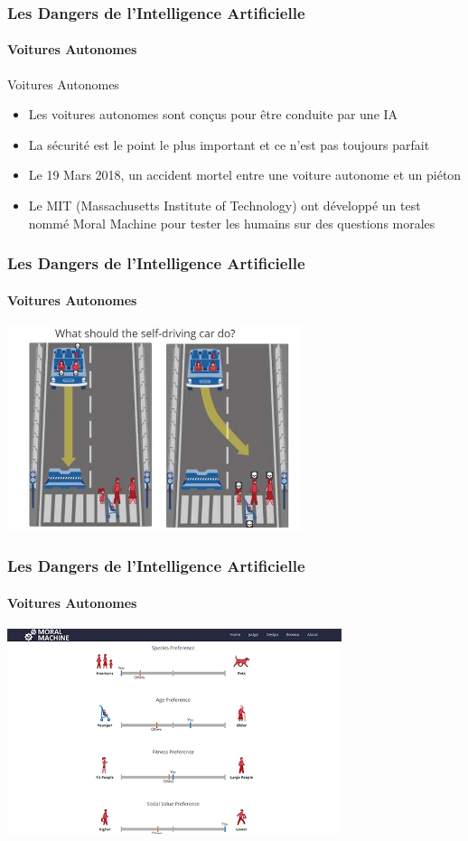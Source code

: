 \documentclass{beamer}
\begin{document}
	\begin{frame}
	\frametitle{Les Dangers de l'Intelligence Artificielle}
	\framesubtitle{Voitures Autonomes}
	\begin{block}{Voitures Autonomes}
	\begin{itemize}
	\itemsep1em
		\item Les voitures autonomes sont conçus pour être conduite par une IA
		\item La sécurité est le point le plus important et ce n'est pas toujours parfait
		\item Le 19 Mars 2018, un accident mortel entre une voiture autonome et un piéton
		\item Le MIT (Massachusetts Institute of Technology) ont développé un test nommé Moral Machine pour tester les humains sur des questions morales
	\end{itemize}
	\end{block}
	\end{frame}
	
	\begin{frame}
	\frametitle{Les Dangers de l'Intelligence Artificielle}
	\framesubtitle{Voitures Autonomes}
	\centerline{\includegraphics[height=6cm]{MIT.jpg}}
	\end{frame}
	
	\begin{frame}
	\frametitle{Les Dangers de l'Intelligence Artificielle}
	\framesubtitle{Voitures Autonomes}
	\centerline{\includegraphics[height=6cm]{MIT2.png}}
	\end{frame}
	
\end{document}

